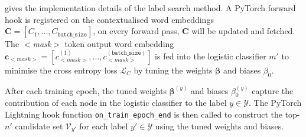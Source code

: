  gives the implementation details of the label search method. A PyTorch forward hook is registered on the contextualised word embeddings $\textbf{C} = [C_1, ..., C_{\texttt{batch\_size}}]$, on every forward pass, $\textbf{C}$ will be updated and fetched. The $<$\textit{mask}$>$ token output word embedding $\textbf{c}_{<\textit{mask}>} = [c_{<\textit{mask}>}^{(1)}, ..., c_{<\textit{mask}>}^{(\texttt{batch\_size})}]$ is fed into the logistic classifier $m'$ to minimise the cross entropy loss $\mathcal{L}_C$ by tuning the weights $\boldsymbol{\beta}$ and biases $\beta_0$. 

After each training epoch, the tuned weights $\boldsymbol{\beta}^{(y)}$ and biases $\beta_0^{(y)}$ capture the contribution of each node in the logistic classifier to the label $y \in \mathcal{Y}$. The PyTorch Lightning hook function \texttt{on\_train\_epoch\_end} is then called to construct the top-$n'$ candidate set $\mathcal{V}_{y'}$ for each label $y' \in \mathcal{Y}$ using the tuned weights and biases.

